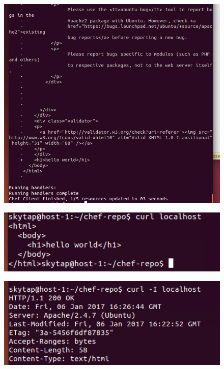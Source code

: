 \documentclass[12pt,letterpaper,boxed]{hmcpset}
\begin{document}
\begin{figure}[H]
  \centering
  \includegraphics[width = 1.0\textwidth]{21.png}
\end{figure}
\begin{figure}[H]
  \centering
  \includegraphics[width = 1.0\textwidth]{22.png}
\end{figure}
\begin{figure}[H]
  \centering
  \includegraphics[width = 1.0\textwidth]{23.png}
\end{figure}
\end{document}
